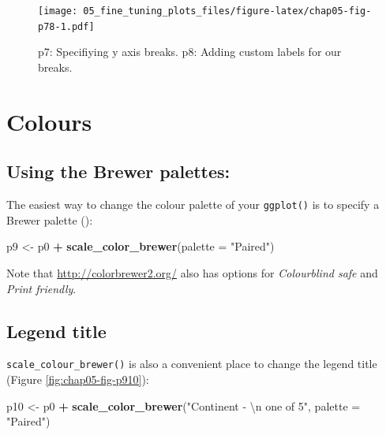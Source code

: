 \documentclass[
  12pt,
  krantz2]{krantz}
\makeatletter
\newenvironment{Shaded}{\begin{snugshade}}{\end{snugshade}}
\newcommand{\CharTok}[1]{\textcolor[rgb]{0.31,0.60,0.02}{#1}}
\newcommand{\DataTypeTok}[1]{\textcolor[rgb]{0.13,0.29,0.53}{#1}}
\newcommand{\KeywordTok}[1]{\textcolor[rgb]{0.13,0.29,0.53}{\textbf{#1}}}
\newcommand{\NormalTok}[1]{#1}
\newcommand{\OperatorTok}[1]{\textcolor[rgb]{0.81,0.36,0.00}{\textbf{#1}}}
\newcommand{\StringTok}[1]{\textcolor[rgb]{0.31,0.60,0.02}{#1}}
\newenvironment{kframe}{%
\medskip{}
\setlength{\fboxsep}{.8em}
 \def\at@end@of@kframe{}%
 \ifinner\ifhmode%
  \def\at@end@of@kframe{\end{minipage}}%
  \begin{minipage}{\columnwidth}%
 \fi\fi%
 \def\FrameCommand##1{\hskip\@totalleftmargin \hskip-\fboxsep
 \colorbox{shadecolor}{##1}\hskip-\fboxsep
     \hskip-\linewidth \hskip-\@totalleftmargin \hskip\columnwidth}%
 \MakeFramed {\advance\hsize-\width
   \@totalleftmargin\z@ \linewidth\hsize
   \@setminipage}}%
 {\par\unskip\endMakeFramed%
 \at@end@of@kframe}
\renewenvironment{Shaded}{\begin{kframe}}{\end{kframe}}
\makeatother
\begin{document}
\begin{figure}
\centering
\texttt{[image: 05\_fine\_tuning\_plots\_files/figure-latex/chap05-fig-p78-1.pdf]}
\caption{\label{fig:chap05-fig-p78}p7: Specifiying y axis breaks. p8: Adding custom labels for our breaks.}
\end{figure}

\hypertarget{colours}{%
\section{Colours}\label{colours}}


\hypertarget{using-the-brewer-palettes}{%
\subsection{Using the Brewer palettes:}\label{using-the-brewer-palettes}}

The easiest way to change the colour palette of your \texttt{ggplot()} is to specify a Brewer palette (\citet{brewer2003}):

\begin{Shaded}
\begin{Highlighting}[]
\NormalTok{p9 <-}\StringTok{ }\NormalTok{p0 }\OperatorTok{+}
\StringTok{  }\KeywordTok{scale_color_brewer}\NormalTok{(}\DataTypeTok{palette =} \StringTok{"Paired"}\NormalTok{)}
\end{Highlighting}
\end{Shaded}

Note that \url{http://colorbrewer2.org/} also has options for \emph{Colourblind safe} and \emph{Print friendly}.

\hypertarget{legend-title}{%
\subsection{Legend title}\label{legend-title}}


\texttt{scale\_colour\_brewer()} is also a convenient place to change the legend title (Figure \ref{fig:chap05-fig-p910}):

\begin{Shaded}
\begin{Highlighting}[]
\NormalTok{p10 <-}\StringTok{ }\NormalTok{p0 }\OperatorTok{+}
\StringTok{  }\KeywordTok{scale_color_brewer}\NormalTok{(}\StringTok{"Continent - }\CharTok{\textbackslash{}n}\StringTok{ one of 5"}\NormalTok{, }\DataTypeTok{palette =} \StringTok{"Paired"}\NormalTok{)}
\end{Highlighting}
\end{Shaded}
\end{document}
